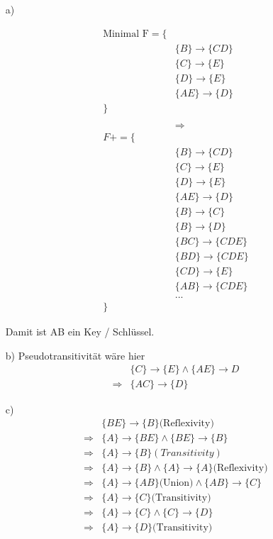 \begin{itemize}

\item[a)]

\begin{align*}
\text{Minimal F} = \{ & \\
& \{B\} \rightarrow \{CD\} \\
& \{C\} \rightarrow \{E\} \\
& \{D\} \rightarrow \{E\} \\
& \{AE\} \rightarrow \{D\} \\
\} & \\ \\
& \Rightarrow \\
F+ = \{ & \\
& \{B\} \rightarrow \{CD\} \\
& \{C\} \rightarrow \{E\} \\
& \{D\} \rightarrow \{E\} \\
& \{AE\} \rightarrow \{D\} \\
& \{B\} \rightarrow \{C\} \\
& \{B\} \rightarrow \{D\} \\
& \{BC\} \rightarrow \{CDE\} \\
& \{BD\} \rightarrow \{CDE\} \\
& \{CD\} \rightarrow \{E\} \\
& \{AB\} \rightarrow \{CDE\} \\
& ... \\
\} &
\end{align*}

Damit ist AB ein Key / Schlüssel.

\item[b)]
Pseudotransitivität wäre hier
\begin{align*}
& \{C\} \rightarrow \{E\} \land \{AE\} \rightarrow D \\
\Rightarrow & \{AC\} \rightarrow \{D\}
\end{align*}

\item[c)]
\begin{align*}
& \{BE\} \rightarrow \{B\} \text{(Reflexivity)} \\
\Rightarrow & \{A\} \rightarrow \{BE\} \land \{BE\} \rightarrow \{B\} \\
\Rightarrow & \{A\} \rightarrow \{B\} (Transitivity) \\
\Rightarrow & \{A\} \rightarrow \{B\} \land \{A\} \rightarrow \{A\} \text{(Reflexivity)} \\
\Rightarrow & \{A\} \rightarrow \{AB\} \text{(Union)} \land \{AB\} \rightarrow \{C\} \\
\Rightarrow & \{A\} \rightarrow \{C\} \text{(Transitivity)} \\
\Rightarrow & \{A\} \rightarrow \{C\} \land \{C\} \rightarrow \{D\} \\
\Rightarrow & \{A\} \rightarrow \{D\} \text{(Transitivity)}
\end{align*}

\end{itemize}

